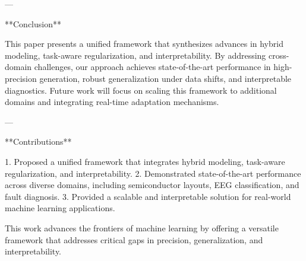 ---

**Conclusion**

This paper presents a unified framework that synthesizes advances in hybrid modeling, task-aware regularization, and interpretability. By addressing cross-domain challenges, our approach achieves state-of-the-art performance in high-precision generation, robust generalization under data shifts, and interpretable diagnostics. Future work will focus on scaling this framework to additional domains and integrating real-time adaptation mechanisms.

---

**Contributions**

1. Proposed a unified framework that integrates hybrid modeling, task-aware regularization, and interpretability.
2. Demonstrated state-of-the-art performance across diverse domains, including semiconductor layouts, EEG classification, and fault diagnosis.
3. Provided a scalable and interpretable solution for real-world machine learning applications.

This work advances the frontiers of machine learning by offering a versatile framework that addresses critical gaps in precision, generalization, and interpretability.